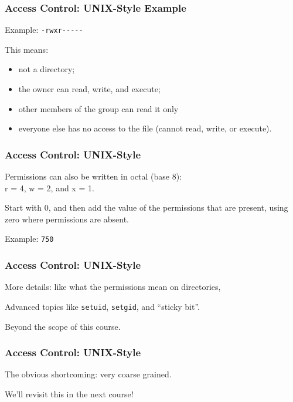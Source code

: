 \begin{frame}
	\frametitle{Access Control: UNIX-Style Example}


	Example: \texttt{-rwxr{-}{-}{-}{-}{-}}

	This means:
	\begin{itemize}
		\item not a directory;
		\item the owner can read, write, and execute;
		\item other members of the group can read it only
		\item everyone else has no access to the file (cannot read, write, or execute).
	\end{itemize}


\end{frame}

\begin{frame}
	\frametitle{Access Control: UNIX-Style}


	Permissions can also be written in octal (base 8): \\
	\quad r = 4, w = 2, and x = 1.

	Start with 0, and then add the value of the  permissions that are present, using zero where permissions are absent.

	Example: \texttt{750} 


\end{frame}

\begin{frame}
	\frametitle{Access Control: UNIX-Style}


	More details: like what the permissions mean on directories,

	Advanced topics like \texttt{setuid}, \texttt{setgid}, and ``sticky bit''.

	Beyond the scope of this course.


\end{frame}

\begin{frame}
	\frametitle{Access Control: UNIX-Style}


	The obvious shortcoming: very coarse grained.

	We'll revisit this in the next course!

\end{frame}




